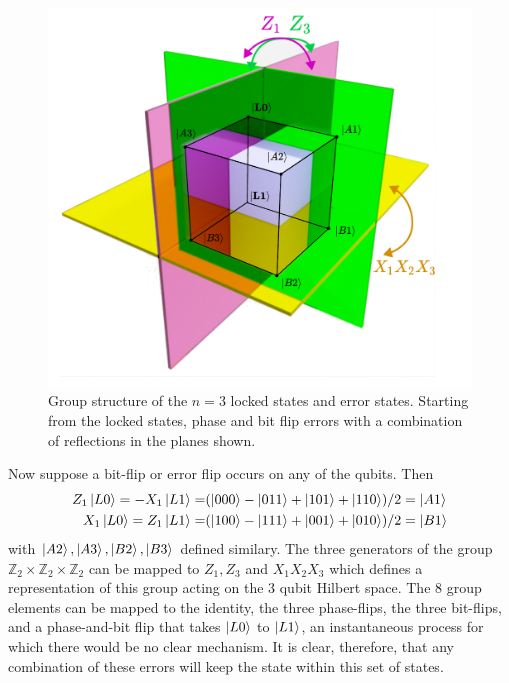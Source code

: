 \documentclass{report}
\begin{document}
\begin{appendices}
\begin{figure}[h]
    \centering
    \includegraphics[scale = 0.6]{Figures/group/group.pdf}
    \caption{Group structure of the $n=3$ locked states and error states. Starting from the locked states, phase and bit flip errors with a combination of reflections in the planes shown.
    }\label{fig:group}
\end{figure}
Now suppose a bit-flip or error flip occurs on any of the qubits. Then 
\begin{align*}
    Z_1\ket{L0} = -X_1\ket{L1} = &(\ket{000} - \ket{011} + \ket{101} + \ket{110})/2 = \ket{A1}\\
    X_1\ket{L0} = Z_1\ket{L1} = &(\ket{100} - \ket{111} + \ket{001} + \ket{010})/2 = \ket{B1}
\end{align*} with $\ket{A2},\ket{A3},\ket{B2},\ket{B3}$ defined similary. The three generators of the group $\mathbb{Z}_2\times\mathbb{Z}_2\times\mathbb{Z}_2$ can be mapped to $Z_1, Z_3$ and $X_1X_2X_3$ which defines a representation of this group acting on the 3 qubit Hilbert space. The 8 group elements can be mapped to the identity, the three phase-flips, the three bit-flips, and a phase-and-bit flip that takes $\ket{L0}$ to $\ket{L1}$, an instantaneous process for which there would be no clear mechanism. It is clear, therefore, that any combination of these errors will keep the state within this set of states.


\end{appendices}
\end{document}
